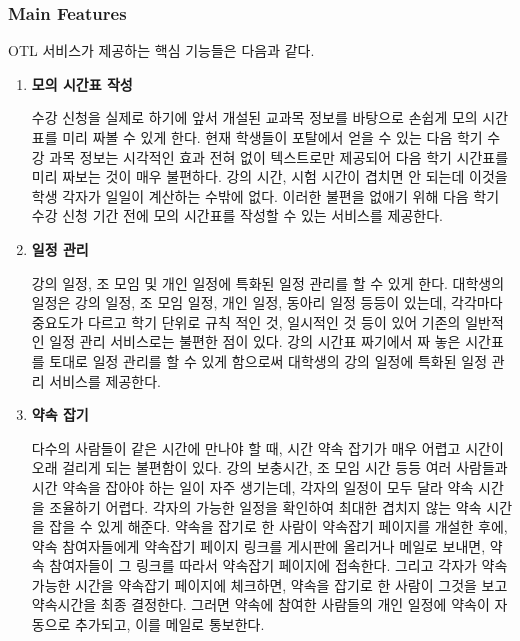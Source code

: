 \documentclass[a4paper,titlepage]{article}
\begin{document}
\subsubsection{Main Features}
OTL 서비스가 제공하는 핵심 기능들은 다음과 같다.
\begin{enumerate}
	\item\textbf{모의 시간표 작성}

	수강 신청을 실제로 하기에 앞서 개설된 교과목 정보를 바탕으로 손쉽게 모의 시간표를 미리 짜볼 수 있게 한다.
	현재 학생들이 포탈에서 얻을 수 있는 다음 학기 수강 과목 정보는 시각적인 효과 전혀 없이 텍스트로만 제공되어 다음 학기 시간표를 미리 짜보는 것이 매우 불편하다.
	강의 시간, 시험 시간이 겹치면 안 되는데 이것을 학생 각자가 일일이 계산하는 수밖에 없다.
	이러한 불편을 없애기 위해 다음 학기 수강 신청 기간 전에 모의 시간표를 작성할 수 있는 서비스를 제공한다.

	\item\textbf{일정 관리}

	강의 일정, 조 모임 및 개인 일정에 특화된 일정 관리를 할 수 있게 한다.
	대학생의 일정은 강의 일정, 조 모임 일정, 개인 일정, 동아리 일정 등등이 있는데, 각각마다 중요도가 다르고 학기 단위로 규칙 적인 것, 일시적인 것 등이 있어 기존의 일반적인 일정 관리 서비스로는 불편한 점이 있다.
	강의 시간표 짜기에서 짜 놓은 시간표를 토대로 일정 관리를 할 수 있게 함으로써 대학생의 강의 일정에 특화된 일정 관리 서비스를 제공한다. 

	\item\textbf{약속 잡기}

	다수의 사람들이 같은 시간에 만나야 할 때, 시간 약속 잡기가 매우 어렵고 시간이 오래 걸리게 되는 불편함이 있다.
	강의 보충시간, 조 모임 시간 등등 여러 사람들과 시간 약속을 잡아야 하는 일이 자주 생기는데, 각자의 일정이 모두 달라 약속 시간을 조율하기 어렵다.
	각자의 가능한 일정을 확인하여 최대한 겹치지 않는 약속 시간을 잡을 수 있게 해준다. 
	약속을 잡기로 한 사람이 약속잡기 페이지를 개설한 후에, 약속 참여자들에게 약속잡기 페이지 링크를 게시판에 올리거나 메일로 보내면, 약속 참여자들이 그 링크를 따라서 약속잡기 페이지에 접속한다.
	그리고 각자가 약속 가능한 시간을 약속잡기 페이지에 체크하면, 약속을 잡기로 한 사람이 그것을 보고 약속시간을 최종 결정한다. 그러면 약속에 참여한 사람들의 개인 일정에 약속이 자동으로 추가되고, 이를 메일로 통보한다.

\end{enumerate}
\end{document}
